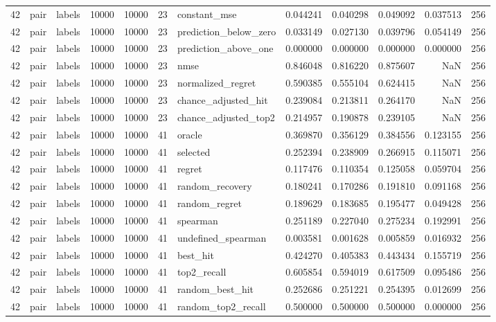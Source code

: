 \begin{tabular}{rllrrrlrrrrr}
42 & pair & labels & 10000 & 10000 & 23 & constant_mse & 0.044241 & 0.040298 & 0.049092 & 0.037513 & 256 \\
42 & pair & labels & 10000 & 10000 & 23 & prediction_below_zero & 0.033149 & 0.027130 & 0.039796 & 0.054149 & 256 \\
42 & pair & labels & 10000 & 10000 & 23 & prediction_above_one & 0.000000 & 0.000000 & 0.000000 & 0.000000 & 256 \\
42 & pair & labels & 10000 & 10000 & 23 & nmse & 0.846048 & 0.816220 & 0.875607 & NaN & 256 \\
42 & pair & labels & 10000 & 10000 & 23 & normalized_regret & 0.590385 & 0.555104 & 0.624415 & NaN & 256 \\
42 & pair & labels & 10000 & 10000 & 23 & chance_adjusted_hit & 0.239084 & 0.213811 & 0.264170 & NaN & 256 \\
42 & pair & labels & 10000 & 10000 & 23 & chance_adjusted_top2 & 0.214957 & 0.190878 & 0.239105 & NaN & 256 \\
42 & pair & labels & 10000 & 10000 & 41 & oracle & 0.369870 & 0.356129 & 0.384556 & 0.123155 & 256 \\
42 & pair & labels & 10000 & 10000 & 41 & selected & 0.252394 & 0.238909 & 0.266915 & 0.115071 & 256 \\
42 & pair & labels & 10000 & 10000 & 41 & regret & 0.117476 & 0.110354 & 0.125058 & 0.059704 & 256 \\
42 & pair & labels & 10000 & 10000 & 41 & random_recovery & 0.180241 & 0.170286 & 0.191810 & 0.091168 & 256 \\
42 & pair & labels & 10000 & 10000 & 41 & random_regret & 0.189629 & 0.183685 & 0.195477 & 0.049428 & 256 \\
42 & pair & labels & 10000 & 10000 & 41 & spearman & 0.251189 & 0.227040 & 0.275234 & 0.192991 & 256 \\
42 & pair & labels & 10000 & 10000 & 41 & undefined_spearman & 0.003581 & 0.001628 & 0.005859 & 0.016932 & 256 \\
42 & pair & labels & 10000 & 10000 & 41 & best_hit & 0.424270 & 0.405383 & 0.443434 & 0.155719 & 256 \\
42 & pair & labels & 10000 & 10000 & 41 & top2_recall & 0.605854 & 0.594019 & 0.617509 & 0.095486 & 256 \\
42 & pair & labels & 10000 & 10000 & 41 & random_best_hit & 0.252686 & 0.251221 & 0.254395 & 0.012699 & 256 \\
42 & pair & labels & 10000 & 10000 & 41 & random_top2_recall & 0.500000 & 0.500000 & 0.500000 & 0.000000 & 256 \\

\end{tabular}
